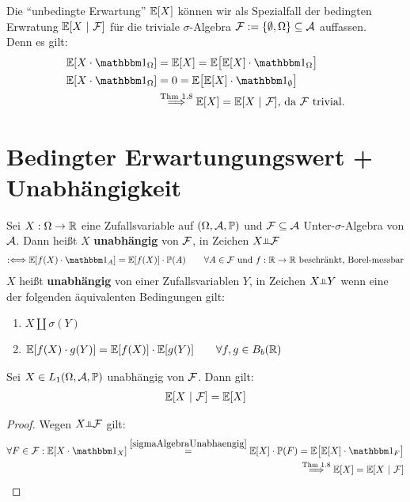 \begin{bemerkung}
Die ``unbedingte Erwartung'' $\mathbb{E}[X]$ können wir als Spezialfall der bedingten Erwratung $\mathbb{E}[X~|~\mathcal{F}]$ für die triviale $\sigma$-Algebra $\mathcal{F}:=\lbrace\emptyset,\Omega\rbrace\subseteq\mathcal{A}$ auffassen.\\
Denn es gilt:
\begin{align*}
\E[X\cdot\indi_\Omega]&=\E[X]=\E\big[\E[X]\cdot\indi_\Omega\big]\\
\E[X\cdot\indi_\Omega]&=0=\E\big[\E[X]\cdot\indi_\emptyset\big]\\
&\stackrel{\text{Thm 1.8}}{\Longrightarrow}
\E[X]=\E[X~|~\F]\text{, da $\F$ trivial.}
\end{align*}
\end{bemerkung}

\section*{Bedingter Erwartungungswert + Unabhängigkeit} %
\begin{defi}
Sei $X:\Omega\to\mathbb{R}$ eine Zufallsvariable auf $(\Omega,\mathcal{A},\mathbb{P})$ und $\mathcal{F}\subseteq\mathcal{A}$ Unter-$\sigma$-Algebra von $\mathcal{A}$. Dann heißt $X$ \textbf{unabhängig} von $\mathcal{F}$, in Zeichen $X\unab\F$
\begin{align}\label{sigmaAlgebraUnabhaengig}
:\Longleftrightarrow
\E[f(X)\cdot\indi_A]
=
\E[f(X)]\cdot\P(A)\qquad\forall A\in\F\text{ und $f:\R\to\R$ beschränkt, Borel-messbar}
\end{align}
$X$ heißt \textbf{unabhängig} von einer Zufallsvariablen $Y$, in Zeichen $X\unab Y$ wenn eine der folgenden äquivalenten Bedingungen gilt:
\begin{enumerate}[label=(\alph*)]
\item $X\amalg\sigma(Y)$
\item 
$\begin{aligned}
\mathbb{E}[f(X)\cdot g(Y)]
=
\mathbb{E}[f(X)]\cdot\mathbb{E}[g(Y)]\qquad\forall f,g\in B_b(\mathbb{R})
\end{aligned}$
\end{enumerate}
\end{defi}

\begin{theorem} %
Sei $X\in L_1(\Omega,\mathcal{A},\mathbb{P})$ unabhängig von $\mathcal{F}$. Dann gilt:
\begin{align*}
\mathbb{E}[X~|~\mathcal{F}]=\mathbb{E}[X]
\end{align*}
\end{theorem}

\begin{proof}
Wegen $X\unab\F$ gilt:
\begin{align*}
\forall F\in\F:\E[X\cdot\indi_X]
\stackeq{\ref{sigmaAlgebraUnabhaengig}}
\E[X]\cdot\P(F)=\E\big[\E[X]\cdot\indi_F\big]\\
\stackrel{\text{Thm 1.8}}{\Longrightarrow}
\E[X]=\E[X~|~\F]
\end{align*}
\end{proof}

